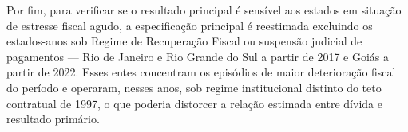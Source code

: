 Por fim, para verificar se o resultado principal é sensível aos estados em situação de estresse fiscal agudo, a especificação principal é reestimada excluindo os estados-anos sob Regime de Recuperação Fiscal ou suspensão judicial de pagamentos --- Rio de Janeiro e Rio Grande do Sul a partir de 2017 e Goiás a partir de 2022. Esses entes concentram os episódios de maior deterioração fiscal do período e operaram, nesses anos, sob regime institucional distinto do teto contratual de 1997, o que poderia distorcer a relação estimada entre dívida e resultado primário.